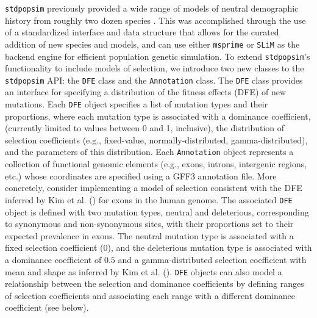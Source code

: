 \documentclass[hidelinks]{article}
\newcommand{\stdpopsim}{\texttt{stdpopsim}\xspace}
\newcommand{\slim}{\texttt{SLiM}\xspace}
\newcommand{\msprime}{\texttt{msprime}\xspace}
\begin{document}
    \stdpopsim previously provided a wide range of models of neutral
    demographic history from roughly two dozen species \citep{lauterbur2023expanding}.
    This was accomplished through the use of a standardized interface
    and data structure that allows for the curated addition of new
    species and models, and can use either
    \msprime \citep{Baumdicker2022} or \slim \citep{haller2019slim}
    as the backend engine for efficient population genetic simulation.
    To extend \stdpopsim's functionality to include models of selection,
    we introduce two new classes
    to the \stdpopsim API: the \texttt{DFE} class and the \texttt{Annotation} class.
    The \texttt{DFE} class provides an interface for specifying
    a distribution of the fitness effects (DFE) of new mutations.
    Each \texttt{DFE} object specifies a list of mutation types and
    their proportions, where
    each mutation type is associated with a dominance coefficient,
    (currently limited to values between 0 and 1, inclusive),
    the distribution of selection coefficients (e.g., fixed-value, normally-distributed, gamma-distributed),
    and the parameters of this distribution.
    Each \texttt{Annotation} object represents a collection of functional
    genomic elements (e.g., exons, introns, intergenic regions, etc.)
    whose coordinates are specified using a GFF3 annotation file.
    More concretely, consider implementing a model of selection consistent with the
    DFE inferred by Kim et al. (\citeyear{kim2017inference}) for exons in the human genome.
    The associated \texttt{DFE} object is defined with two mutation types,
    neutral and deleterious, corresponding to synonymous and non-synonymous sites,
    with their proportions set to their expected prevalence in exons.
    The neutral mutation type is associated with a fixed selection coefficient (0),
    and the deleterious mutation type is associated with a dominance coefficient of $0.5$ and
    a gamma-distributed selection coefficient
    with mean and shape as inferred by Kim et al. (\citeyear{kim2017inference}).
    \texttt{DFE} objects can also model a relationship between the selection and dominance coefficients \citep{huber2018gene}
    by defining ranges of selection coefficients and associating each range with a different dominance coefficient (see below).
\end{document}
